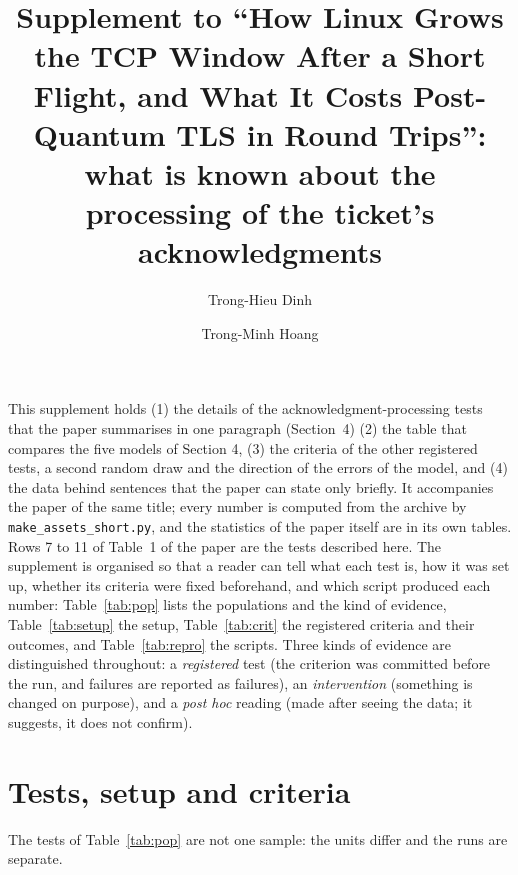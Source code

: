 \documentclass[9pt]{article}
\title{Supplement to ``How Linux Grows the TCP Window After a Short Flight, and What It Costs Post-Quantum TLS in Round Trips'': what is known about the processing of the ticket's acknowledgments}
\author{Trong-Hieu Dinh \and Trong-Minh Hoang}
\date{}
\begin{document}
\maketitle
This supplement holds (1) the details of the acknowledgment-processing tests that the paper summarises in one paragraph (Section~4) (2) the table that compares the five models of Section 4, (3) the criteria of the other registered tests, a second random draw and the direction of the errors of the model, and (4) the data behind sentences that the paper can state only briefly. It accompanies the paper of the same title; every number is computed from the archive by \texttt{make\_assets\_short.py}, and the statistics of the paper itself are in its own tables. Rows 7 to 11 of Table~1 of the paper are the tests described here. The supplement is organised so that a reader can tell what each test is, how it was set up, whether its criteria were fixed beforehand, and which script produced each number: Table~\ref{tab:pop} lists the populations and the kind of evidence, Table~\ref{tab:setup} the setup, Table~\ref{tab:crit} the registered criteria and their outcomes, and Table~\ref{tab:repro} the scripts. Three kinds of evidence are distinguished throughout: a \emph{registered} test (the criterion was committed before the run, and failures are reported as failures), an \emph{intervention} (something is changed on purpose), and a \emph{post hoc} reading (made after seeing the data; it suggests, it does not confirm).

\section*{Tests, setup and criteria}
The tests of Table~\ref{tab:pop} are not one sample: the units differ and the runs are separate.
\end{document}
